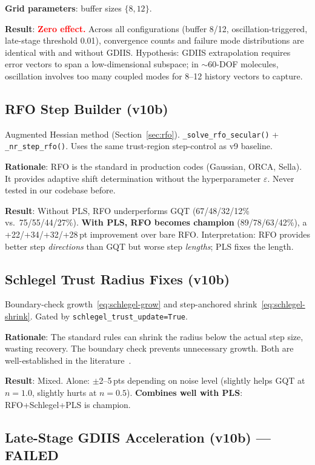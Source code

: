\documentclass[11pt,a4paper]{article}
\theoremstyle{definition}
\begin{document}
\textbf{Grid parameters}: buffer sizes $\{8, 12\}$.

\textbf{Result}: \textcolor{red}{\textbf{Zero effect.}}  Across all
configurations (buffer 8/12, oscillation-triggered, late-stage threshold
0.01), convergence counts and failure mode distributions are identical
with and without GDIIS.  Hypothesis: GDIIS extrapolation requires
error vectors to span a low-dimensional subspace; in $\sim$60-DOF
molecules, oscillation involves too many coupled modes for 8--12
history vectors to capture.

\subsection{RFO Step Builder (v10b)}

Augmented Hessian method (Section~\ref{sec:rfo}).
\texttt{\_solve\_rfo\_secular()} + \texttt{\_nr\_step\_rfo()}.
Uses the same trust-region step-control as v9 baseline.

\textbf{Rationale}: RFO is the standard in production codes (Gaussian, ORCA,
Sella).  It provides adaptive shift determination without the hyperparameter
$\varepsilon$.  Never tested in our codebase before.

\textbf{Result}: Without PLS, RFO underperforms GQT (67/48/32/12\% vs.\
75/55/44/27\%).  \textbf{With PLS, RFO becomes champion}
(89/78/63/42\%), a +22/+34/+32/+28\,pt improvement over bare RFO.
Interpretation: RFO provides better step \emph{directions} than GQT
but worse step \emph{lengths}; PLS fixes the length.

\subsection{Schlegel Trust Radius Fixes (v10b)}

Boundary-check growth~\eqref{eq:schlegel-grow} and step-anchored
shrink~\eqref{eq:schlegel-shrink}.  Gated by
\texttt{schlegel\_trust\_update=True}.

\textbf{Rationale}: The standard rules can shrink the radius below the
actual step size, wasting recovery.  The boundary check prevents
unnecessary growth.  Both are well-established in the
literature~\citep{schlegel2011}.

\textbf{Result}: Mixed.  Alone: $\pm$2--5\,pts depending on noise level
(slightly helps GQT at $n=1.0$, slightly hurts at $n=0.5$).
\textbf{Combines well with PLS}: RFO+Schlegel+PLS is champion.

\subsection{Late-Stage GDIIS Acceleration (v10b) --- FAILED}
\end{document}
